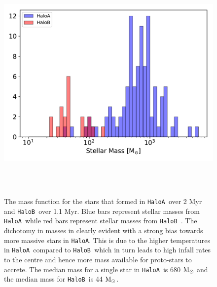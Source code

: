 \documentclass[graphics, twocolumn, usenatbib]{mn2e}
\newcommand{\msolar} {$\rm{M_{\odot}}~$}
\newcommand{\msolarc} {$\rm{M_{\odot}}$}
\newcommand{\ha} {\texttt{HaloA~}}
\newcommand{\hb} {\texttt{HaloB~}}
\newcommand{\hac} {\texttt{HaloA}}
\begin{document}
 
\begin{figure}
\centering
\begin{minipage}{175mm}      \begin{center}
\centerline{
    \includegraphics[width=18.0cm, height=12cm]{FIGURES/FinalMass_MultipleHaloes.pdf}}
\caption{
  The mass function for the stars that formed in \ha over 2 Myr and \hb over 1.1 Myr.
  Blue bars represent stellar masses from \ha while red bars represent stellar masses from \hb.
  The dichotomy in masses in clearly evident with a strong bias towards more massive stars
  in \hac. This is due to the higher temperatures in \ha compared to \hb which in turn
  leads to high infall rates to the centre and hence more mass available for proto-stars
  to accrete. The median mass for a single star in \ha is 680 \msolar and the median mass
  for \hb is 44 \msolarc. 
}
\label{Fig:MassFunction}
\end{center} \end{minipage}
\end{figure}
\end{document}
